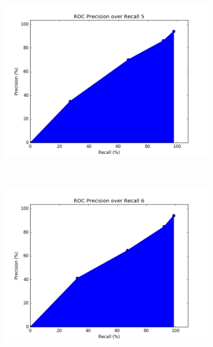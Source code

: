 \documentclass[12pt]{article}
\begin{document}
\begin{figure}[h!]
        \begin{subfigure}[t]{0.5\textwidth}
        \centering
        \includegraphics[width=1.\textwidth]{graphs/problem3_ROC5}
        \caption{}
    \end{subfigure}%
    ~ 
    \begin{subfigure}[t]{0.5\textwidth}
        \centering
        \includegraphics[width=1.\textwidth]{graphs/problem3_ROC6}
        \caption{}
    \end{subfigure}%
  

\end{figure}
\end{document}
